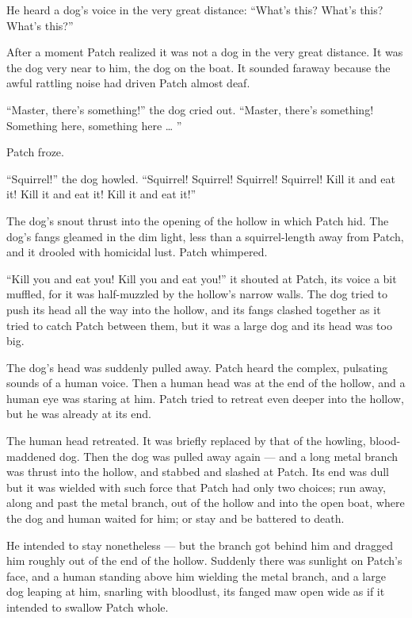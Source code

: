 \documentclass[ebook,oneside,openany,17pt]{memoir}
\newenvironment{tolerant}[1]{%
  \par\tolerance=#1\relax
}{%
  \par
}
\begin{document}
He heard a dog’s voice in the very great distance: “What’s this?
What’s this? What’s this?”

After a moment Patch realized it was not a dog in the very great
distance. It was the dog very near to him, the dog on the boat. It
sounded faraway because the awful rattling noise had driven Patch
almost deaf.

“Master, there’s something!” the dog cried out. “Master, there’s
something! Something here, something here … ”

Patch froze.

“Squirrel!” the dog howled. “Squirrel! Squirrel! Squirrel!  Squirrel!
Kill it and eat it! Kill it and eat it! Kill it and eat it!”

The dog’s snout thrust into the opening of the hollow in which Patch
hid. The dog’s fangs gleamed in the dim light, less than a
squirrel-length away from Patch, and it drooled with homicidal
lust. Patch whimpered.

“Kill you and eat you! Kill you and eat you!” it shouted at Patch, its
voice a bit muffled, for it was half-muzzled by the hollow’s narrow
walls. The dog tried to push its head all the way into the hollow, and
its fangs clashed together as it tried to catch Patch between them,
but it was a large dog and its head was too big.

The dog’s head was suddenly pulled away. Patch heard the complex,
pulsating sounds of a human voice. Then a human head was at the end of
the hollow, and a human eye was staring at him. Patch tried to retreat
even deeper into the hollow, but he was already at its end.

The human head retreated. It was briefly replaced by that of the
howling, blood-maddened dog. Then the dog was pulled away again — and
a long metal branch was thrust into the hollow, and stabbed and
slashed at Patch. Its end was dull but it was wielded with such force
that Patch had only two choices; run away, along and past the metal
branch, out of the hollow and into the open boat, where the dog and
human waited for him; or stay and be battered to death.

\begin{tolerant}{2000}
He intended to stay nonetheless — but the branch got behind him and
dragged him roughly out of the end of the hollow. Suddenly there was
sunlight on Patch’s face, and a human standing above him wielding the
metal branch, and a large dog leaping at him, snarling with bloodlust,
its fanged maw open wide as if it intended to swallow Patch whole.
\end{tolerant}
\end{document}
